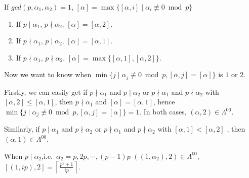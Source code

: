 If $gcd(p,\alpha_1,\alpha_2)=1$, $[\alpha]=\max\{[\alpha,i]\mid  \alpha_i  \not\equiv 0 \bmod p\}$
\begin{enumerate}
	\item If $p\mid \alpha_1$, $p\nmid \alpha_2$, $[\alpha]=[\alpha,2]$.
	\item If $p\nmid \alpha_1$, $p\mid \alpha_2$, $[\alpha]=[\alpha,1]$.
	\item If $p\nmid \alpha_1$, $p\nmid \alpha_2$, $[\alpha]=\max\{[\alpha,1],[\alpha,2]\}$.
\end{enumerate}

Now we want to know when $\min\{j\mid \alpha_j\not\equiv 0 \bmod p, [\alpha,j]=[\alpha]\}$ is $1$ or $2$.

Firstly, we can easily get if  $p\nmid \alpha_1$ and $p\mid \alpha_2$ or $p\nmid \alpha_1$ and $p\nmid \alpha_2$ with $[\alpha,2]\leq [\alpha,1]$, then $p\nmid \alpha_1$ and $[\alpha]=[\alpha,1]$, hence $\min\{j\mid \alpha_j\not\equiv 0 \bmod p, [\alpha,j]=[\alpha]\}=1$. In both cases, $(\alpha,2)\in\Lambda^{00}$.

Similarly, if $p\mid\alpha_1$ and $p\nmid \alpha_2$ or $p\nmid\alpha_1$ and $p\nmid \alpha_2$ with $[\alpha,1] < [\alpha,2]$ , then $(\alpha,1)\in\Lambda^{00}$.

When $p\mid \alpha_2$,i.e.\ $\alpha_2=p,2p,\cdots,(p-1)p$ $((1,\alpha_2),2)\in \Lambda^{00}$, $[(1,ip),2]=\left \lceil \frac{p^2+1}{ip} \right \rceil$.

















